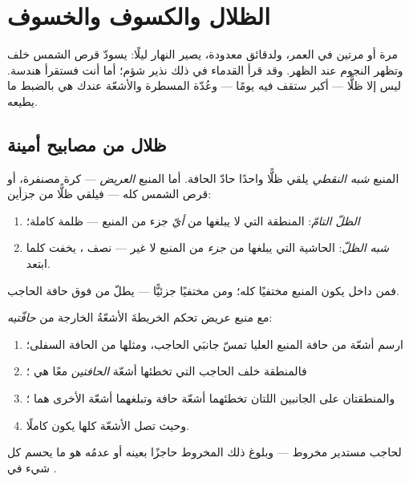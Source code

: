 \chapter{الظلال والكسوف والخسوف}\label{ch:g7:shadows-eclipses}

مرة أو مرتين في العمر، ولدقائق معدودة، يصير النهار ليلًا: يسودّ
قرص الشمس خلف  وتظهر النجوم عند الظهر. وقد قرأ القدماء في
ذلك نذير شؤم؛ أما أنت فستقرأ هندسة.  ليس إلا ظلًّا ---
أكبر  ستقف فيه يومًا --- وعُدّة المسطرة والأشعّة عندك هي
بالضبط ما يطيعه.

\section{ظلال من مصابيح أمينة}

\begin{proposition}\label{prop:g7:shadows-eclipses:umbra}
المنبع \emph{شبه النقطي} يلقي ظلًّا واحدًا حادّ الحافة. أما
المنبع \emph{العريض} --- كرة مصنفرة، أو قرص الشمس كله ---
فيلقي ظلًّا من جزأين:
\begin{enumerate}
  \item \emph{الظلّ التامّ}: المنطقة التي لا
        يبلغها  من \emph{أيّ} جزء من المنبع --- ظلمة
        كاملة؛
  \item \emph{شبه الظلّ}: الحاشية التي يبلغها
         من \emph{جزء} من المنبع لا غير --- نصف ، يخفت
        كلما ابتعد.
\end{enumerate}
فمن داخل  يكون المنبع مختفيًا كله؛ ومن 
مختفيًا جزئيًّا --- يطلّ من فوق حافة الحاجب.
\end{proposition}

\begin{method}\label{met:g7:shadows-eclipses:construct}
مع منبع عريض تحكم الخريطةَ الأشعّةُ الخارجة من \emph{حافّتيه}:
\begin{enumerate}
  \item ارسم أشعّة من حافة المنبع العليا تمسّ جانبَي الحاجب،
        ومثلها من الحافة السفلى؛
  \item فالمنطقة خلف الحاجب التي تخطئها أشعّة \emph{الحافتين}
        معًا هي ؛
  \item والمنطقتان على الجانبين اللتان تخطئهما أشعّة حافة
        وتبلغهما أشعّة الأخرى هما ؛
  \item وحيث تصل الأشعّة كلها يكون  كاملًا.
\end{enumerate}
 لحاجب مستدير مخروط --- وبلوغ ذلك المخروط حاجزًا
بعينه أو عدمُه هو ما يحسم كل شيء في  .
\end{method}

